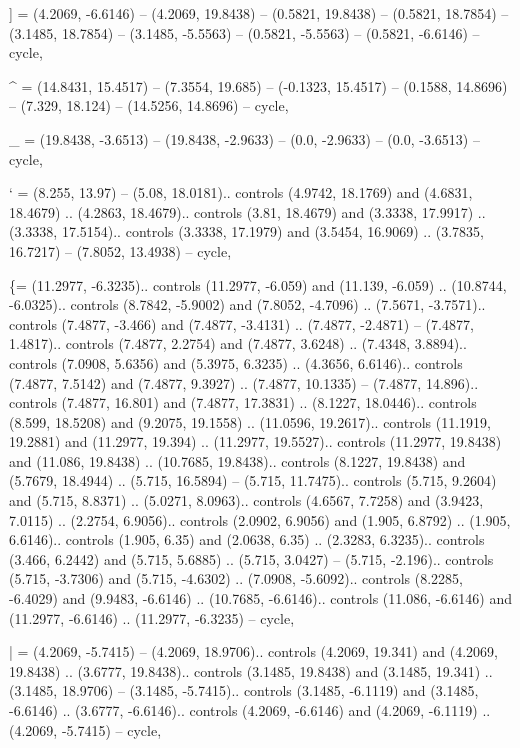 ] = {(4.2069, -6.6146) -- (4.2069, 19.8438) -- (0.5821, 19.8438) -- (0.5821, 18.7854) -- (3.1485, 18.7854) -- (3.1485, -5.5563) -- (0.5821, -5.5563) -- (0.5821, -6.6146) -- cycle},

^ = {(14.8431, 15.4517) -- (7.3554, 19.685) -- (-0.1323, 15.4517) -- (0.1588, 14.8696) -- (7.329, 18.124) -- (14.5256, 14.8696) -- cycle},

_ = {(19.8438, -3.6513) -- (19.8438, -2.9633) -- (0.0, -2.9633) -- (0.0, -3.6513) -- cycle},

` = {(8.255, 13.97) -- (5.08, 18.0181).. controls (4.9742, 18.1769) and (4.6831, 18.4679) .. (4.2863, 18.4679).. controls (3.81, 18.4679) and (3.3338, 17.9917) .. (3.3338, 17.5154).. controls (3.3338, 17.1979) and (3.5454, 16.9069) .. (3.7835, 16.7217) -- (7.8052, 13.4938) -- cycle},

\{= {(11.2977, -6.3235).. controls (11.2977, -6.059) and (11.139, -6.059) .. (10.8744, -6.0325).. controls (8.7842, -5.9002) and (7.8052, -4.7096) .. (7.5671, -3.7571).. controls (7.4877, -3.466) and (7.4877, -3.4131) .. (7.4877, -2.4871) -- (7.4877, 1.4817).. controls (7.4877, 2.2754) and (7.4877, 3.6248) .. (7.4348, 3.8894).. controls (7.0908, 5.6356) and (5.3975, 6.3235) .. (4.3656, 6.6146).. controls (7.4877, 7.5142) and (7.4877, 9.3927) .. (7.4877, 10.1335) -- (7.4877, 14.896).. controls (7.4877, 16.801) and (7.4877, 17.3831) .. (8.1227, 18.0446).. controls (8.599, 18.5208) and (9.2075, 19.1558) .. (11.0596, 19.2617).. controls (11.1919, 19.2881) and (11.2977, 19.394) .. (11.2977, 19.5527).. controls (11.2977, 19.8438) and (11.086, 19.8438) .. (10.7685, 19.8438).. controls (8.1227, 19.8438) and (5.7679, 18.4944) .. (5.715, 16.5894) -- (5.715, 11.7475).. controls (5.715, 9.2604) and (5.715, 8.8371) .. (5.0271, 8.0963).. controls (4.6567, 7.7258) and (3.9423, 7.0115) .. (2.2754, 6.9056).. controls (2.0902, 6.9056) and (1.905, 6.8792) .. (1.905, 6.6146).. controls (1.905, 6.35) and (2.0638, 6.35) .. (2.3283, 6.3235).. controls (3.466, 6.2442) and (5.715, 5.6885) .. (5.715, 3.0427) -- (5.715, -2.196).. controls (5.715, -3.7306) and (5.715, -4.6302) .. (7.0908, -5.6092).. controls (8.2285, -6.4029) and (9.9483, -6.6146) .. (10.7685, -6.6146).. controls (11.086, -6.6146) and (11.2977, -6.6146) .. (11.2977, -6.3235) -- cycle},

| = {(4.2069, -5.7415) -- (4.2069, 18.9706).. controls (4.2069, 19.341) and (4.2069, 19.8438) .. (3.6777, 19.8438).. controls (3.1485, 19.8438) and (3.1485, 19.341) .. (3.1485, 18.9706) -- (3.1485, -5.7415).. controls (3.1485, -6.1119) and (3.1485, -6.6146) .. (3.6777, -6.6146).. controls (4.2069, -6.6146) and (4.2069, -6.1119) .. (4.2069, -5.7415) -- cycle},

